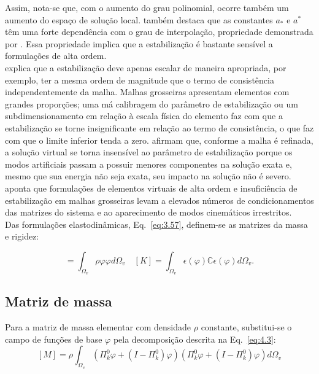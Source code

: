     \indent Assim, nota-se que, com o aumento do grau polinomial, ocorre também um aumento do espaço de solução local. \citet{illconditioningvirtualelementmethodstabilizationsbases2018} também destaca que as constantes $a_*$ e $a^*$ têm uma forte dependência com o grau de interpolação, propriedade demonstrada por \citet{exponentialconvergencehpvirtualelementmethodpresencecornersingularities2018}. Essa propriedade implica que a estabilização é bastante sensível a formulações de alta ordem.\\
    \indent \citet{engineeringperspectivevirtualelementmethoditsinterplaystandardfiniteelementmethod2019a} explica que a estabilização deve apenas escalar de maneira apropriada, por exemplo, ter a mesma ordem de magnitude que o termo de consistência independentemente da malha. Malhas grosseiras apresentam elementos com grandes proporções; uma má calibragem do parâmetro de estabilização ou um subdimensionamento em relação à escala física do elemento faz com que a estabilização se torne insignificante em relação ao termo de consistência, o que faz com que o limite inferior tenda a zero. \citet{quantitativestudystabilizationparametervirtualelementmethod2024} afirmam que, conforme a malha é refinada, a solução virtual se torna insensível ao parâmetro de estabilização porque os modos artificiais passam a possuir menores componentes na solução exata e, mesmo que sua energia não seja exata, seu impacto na solução não é severo.\\
    \indent \citet{virtualelementmethodtopologyoptimizationpolygonalmeshesnumericalstudy2016} aponta que formulações de elementos virtuais de alta ordem e insuficiência de estabilização em malhas grosseiras levam a elevados números de condicionamentos das matrizes do sistema e ao aparecimento de modos cinemáticos irrestritos.\\
    \indent Das formulações elastodinâmicas, Eq.~\ref{eq:3.57}, definem-se as matrizes da massa e rigidez: 

    \begin{equation}
        [M] = \int_{\Omega_v} \rho \varphi \varphi d\Omega_v \quad [K] = \int_{\Omega_v} \epsilon(\varphi) \mathbb{C} \epsilon(\varphi) d\Omega_v.
        \label{eq:4.54}
    \end{equation}

\subsection{Matriz de massa}

    \indent Para a matriz de massa elementar com densidade $\rho$ constante, substitui-se o campo de funções de base $\varphi$ pela decomposição descrita na Eq.~\ref{eq:4.3}: $$[M] = \rho\int_{\Omega_v} (\Pi_k^0 \varphi + (I - \Pi_k^0) \varphi) (\Pi_k^0 \varphi + (I - \Pi_k^0) \varphi) d\Omega_v$$
    
